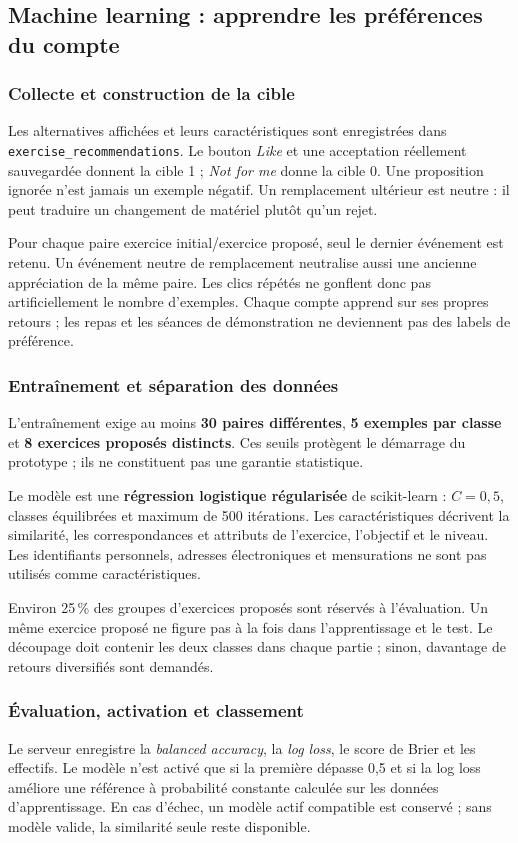 \documentclass[11pt,a4paper]{article}
\begin{document}
\clearpage
\subsection{Machine learning : apprendre les préférences du compte}
\subsubsection{Collecte et construction de la cible}
Les alternatives affichées et leurs caractéristiques sont enregistrées dans \texttt{exercise\_recommendations}. Le bouton \textit{Like} et une acceptation réellement sauvegardée donnent la cible 1 ; \textit{Not for me} donne la cible 0. Une proposition ignorée n'est jamais un exemple négatif. Un remplacement ultérieur est neutre : il peut traduire un changement de matériel plutôt qu'un rejet.

Pour chaque paire exercice initial/exercice proposé, seul le dernier événement est retenu. Un événement neutre de remplacement neutralise aussi une ancienne appréciation de la même paire. Les clics répétés ne gonflent donc pas artificiellement le nombre d'exemples. Chaque compte apprend sur ses propres retours ; les repas et les séances de démonstration ne deviennent pas des labels de préférence.

\subsubsection{Entraînement et séparation des données}
L'entraînement exige au moins \textbf{30 paires différentes}, \textbf{5 exemples par classe} et \textbf{8 exercices proposés distincts}. Ces seuils protègent le démarrage du prototype ; ils ne constituent pas une garantie statistique.

Le modèle est une \textbf{régression logistique régularisée} de scikit-learn : \(C=0{,}5\), classes équilibrées et maximum de 500 itérations. Les caractéristiques décrivent la similarité, les correspondances et attributs de l'exercice, l'objectif et le niveau. Les identifiants personnels, adresses électroniques et mensurations ne sont pas utilisés comme caractéristiques.

Environ 25\,\% des groupes d'exercices proposés sont réservés à l'évaluation. Un même exercice proposé ne figure pas à la fois dans l'apprentissage et le test. Le découpage doit contenir les deux classes dans chaque partie ; sinon, davantage de retours diversifiés sont demandés.

\subsubsection{Évaluation, activation et classement}
Le serveur enregistre la \textit{balanced accuracy}, la \textit{log loss}, le score de Brier et les effectifs. Le modèle n'est activé que si la première dépasse 0,5 et si la log loss améliore une référence à probabilité constante calculée sur les données d'apprentissage. En cas d'échec, un modèle actif compatible est conservé ; sans modèle valide, la similarité seule reste disponible.
\end{document}
